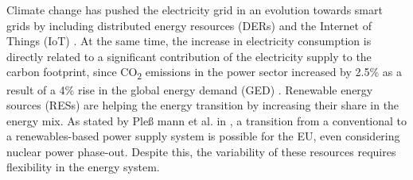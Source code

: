 Climate change has pushed the electricity grid in an evolution towards smart grids by including distributed energy resources (DERs) and the {Internet of Things (IoT)} \cite{EuropeanCommission2012}. At the same time, the increase in electricity consumption is directly related to a significant contribution of the electricity supply to the carbon footprint, since CO\textsubscript 2 emissions in the power sector increased by 2.5\% as a result of a 4\% rise  in the global energy demand (GED) \cite{IEA2018}. Renewable energy sources (RESs) are helping the energy transition by increasing their share in the energy mix. {As stated by Ple{\ss}%
mann et al. in \cite{PLEMANN201719}, a transition from a conventional to a renewables-based power supply system is possible for the EU, even considering nuclear power phase-out.} Despite this, the variability of these resources requires flexibility in the energy system.

